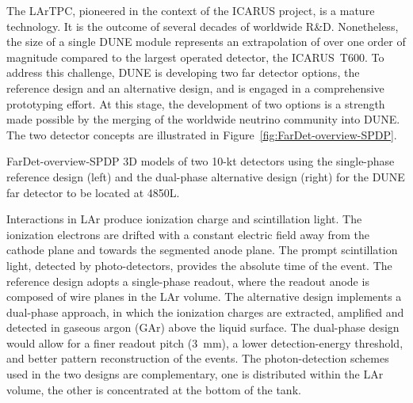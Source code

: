 The LArTPC, pioneered in the context of the ICARUS project, is a mature technology. It is the outcome
of several decades of worldwide R\&D.  Nonetheless, the size of a single  DUNE module represents an extrapolation of over one order of magnitude compared to the largest operated detector, the ICARUS~T600. To address this challenge, DUNE is developing two far detector options, the reference design and an alternative design, and is engaged in a 
comprehensive prototyping effort. At this stage, the development of two options is a strength %
made possible by the merging of the worldwide neutrino community into DUNE.  The two detector
concepts are illustrated in Figure~\ref{fig:FarDet-overview-SPDP}.

\begin{dunefigure}{FarDet-overview-SPDP}
{3D models of two 10-kt detectors using the single-phase reference design (left) 
and the dual-phase alternative design (right) for the DUNE far detector to be 
located at 4850L.}
\centering
\begin{minipage}[b]{1.0\textwidth}
\begin{center}
\end{center}
\end{minipage}
\end{dunefigure}


Interactions in LAr produce ionization charge and scintillation light.
The ionization electrons are drifted with a constant electric field away from the cathode
plane and towards the segmented anode plane. 
The prompt scintillation light,
detected by photo-detectors, provides the absolute time of the event.
The reference design adopts a single-phase readout, where the readout anode is composed of wire planes in the LAr volume. 
The alternative design implements a  dual-phase approach, in which the 
ionization charges are extracted, amplified and detected in gaseous argon (GAr) above the liquid surface. 
The dual-phase design would allow for a finer readout pitch (3~mm), 
a lower detection-energy threshold, and better pattern reconstruction of the events.
The photon-detection schemes used in the two designs are complementary, one is distributed
within the LAr volume, the other is concentrated at the bottom of the tank.


